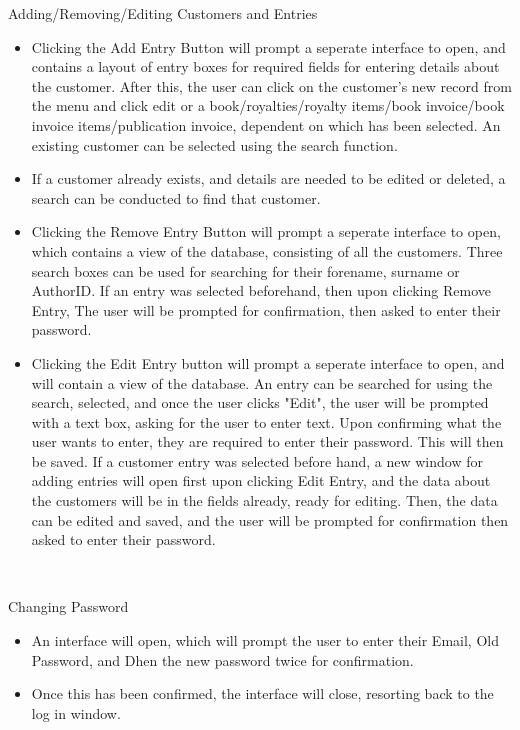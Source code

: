 Adding/Removing/Editing Customers and Entries
\begin{itemize}
    \item Clicking the Add Entry Button will prompt a seperate interface to open, and contains a layout of entry boxes for required fields for entering details about the customer. After this, the user can click on the customer's new record from the menu and click edit or a book/royalties/royalty items/book invoice/book invoice items/publication invoice, dependent on which has been selected. An existing customer can be selected using the search function.
    \item If a customer already exists, and details are needed to be edited or deleted, a search can be conducted to find that customer.
    \item Clicking the Remove Entry Button will prompt a seperate interface to open, which contains a view of the database, consisting of all the customers. Three search boxes can be used for searching for their forename, surname or AuthorID. If an entry was selected beforehand, then upon clicking Remove Entry, The user will be prompted for confirmation, then asked to enter their password. 
    \item Clicking the Edit Entry button will prompt a seperate interface to open, and will contain a view of the database. An entry can be searched for using the search, selected, and once the user clicks "Edit", the user will be prompted with a text box, asking for the user to enter text. Upon confirming what the user wants to enter, they are required to enter their password. This will then be saved. If a customer entry was selected before hand, a new window for adding entries will open first upon clicking Edit Entry, and the data about the customers will be in the fields already, ready for editing. Then, the data can be edited and saved, and the user will be prompted for confirmation then asked to enter their password.
\end{itemize}

\

Changing Password
\begin{itemize}
    \item An interface will open, which will prompt the user to enter their Email, Old Password, and Dhen the new password twice for confirmation.
    \item Once this has been confirmed, the interface will close, resorting back to the log in window.
\end{itemize}

